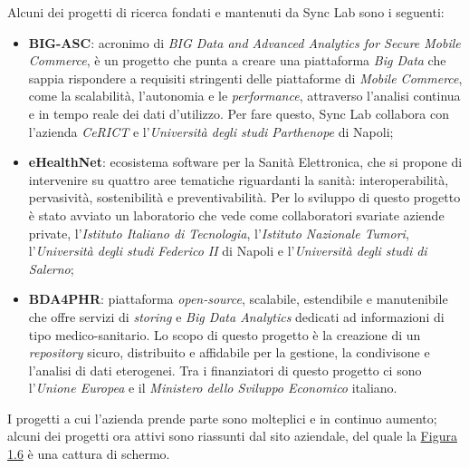 
Alcuni dei progetti di ricerca fondati e mantenuti da Sync Lab sono i seguenti:
\begin{itemize}
  \item \textbf{BIG-ASC}: acronimo di \textit{BIG Data and Advanced Analytics for Secure Mobile Commerce}, è un progetto che punta a creare una piattaforma \textit{Big Data} che sappia rispondere a requisiti stringenti delle piattaforme di \textit{Mobile Commerce}, come la scalabilità, l'autonomia e le \textit{performance}, attraverso l'analisi continua e in tempo reale dei dati d'utilizzo. Per fare questo, Sync Lab collabora con l'azienda \textit{CeRICT} e l'\textit{Università degli studi Parthenope} di Napoli;
  \item \textbf{eHealthNet}: ecosistema software per la Sanità Elettronica, che si propone di intervenire su quattro aree tematiche riguardanti la sanità: interoperabilità, pervasività, sostenibilità e preventivabilità. Per lo sviluppo di questo progetto è stato avviato un laboratorio che vede come collaboratori svariate aziende private, l'\textit{Istituto Italiano di Tecnologia}, l'\textit{Istituto Nazionale Tumori}, l'\textit{Università degli studi Federico II} di Napoli e l'\textit{Università degli studi di Salerno};
  \item \textbf{BDA4PHR}: piattaforma \textit{open-source}, scalabile, estendibile e manutenibile che offre servizi di \textit{storing} e \textit{Big Data Analytics} dedicati ad informazioni di tipo medico-sanitario. Lo scopo di questo progetto è la creazione di un \textit{repository} sicuro, distribuito e affidabile per la gestione, la condivisone e l'analisi di dati eterogenei. Tra i finanziatori di questo progetto ci sono l'\textit{Unione Europea} e il \textit{Ministero dello Sviluppo Economico} italiano. \\
\end{itemize}

I progetti a cui l'azienda prende parte sono molteplici e in continuo aumento; alcuni dei progetti ora attivi sono riassunti dal sito aziendale, del quale la \hyperref[img:progetti]{Figura 1.6} è una cattura di schermo. \\

